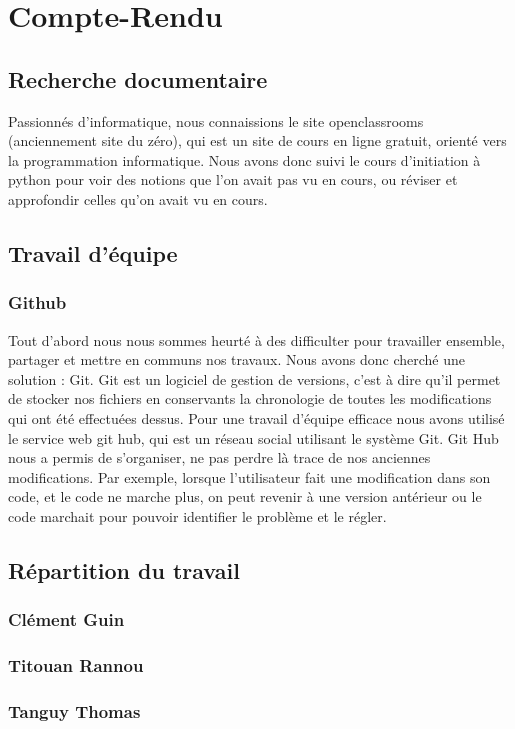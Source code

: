 \documentclass[a4paper,11pt,french]{article}
\begin{document}
\section{Compte-Rendu}
\subsection{Recherche documentaire}
Passionnés d'informatique, nous connaissions le site openclassrooms (anciennement site du zéro), qui est un site de cours en ligne gratuit, orienté vers la programmation informatique. Nous avons donc suivi le cours d'initiation à python pour voir des notions que l'on avait pas vu en cours, ou réviser et approfondir celles qu'on avait vu en cours. 
\subsection{Travail d'équipe}
\subsubsection{Github}
Tout d'abord nous nous sommes heurté à des difficulter pour travailler ensemble, partager et mettre en communs nos travaux. Nous avons donc cherché une solution : Git. Git est un logiciel de gestion de versions, c'est à dire qu'il permet de stocker nos fichiers en conservants la chronologie de toutes les modifications qui ont été effectuées dessus. Pour une travail d'équipe efficace nous avons utilisé le service web git hub, qui est un réseau social utilisant le système Git. Git Hub nous a permis de s'organiser, ne pas perdre là trace de nos anciennes modifications. Par exemple, lorsque l'utilisateur fait une modification dans son code, et le code ne marche plus, on peut revenir à une version antérieur ou le code marchait pour pouvoir identifier le problème et le régler.
\subsection{Répartition du travail}
\subsubsection{Clément Guin}
\subsubsection{Titouan Rannou}
\subsubsection{Tanguy Thomas}
























\newpage 
\end{document}
